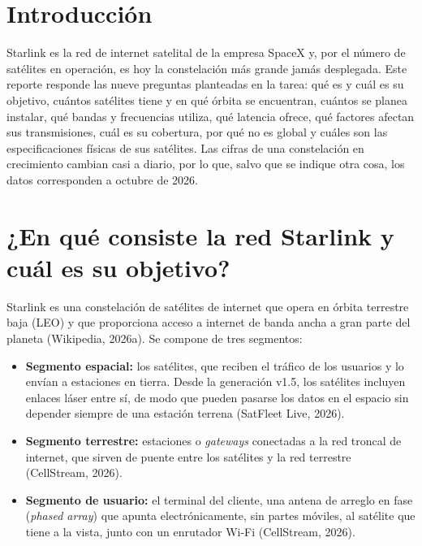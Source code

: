 \documentclass[12pt,letterpaper]{article}
\begin{document}
\tableofcontents
\newpage

\section{Introducción}

Starlink es la red de internet satelital de la empresa SpaceX y, por el número de satélites en operación, es hoy la constelación más grande jamás desplegada. Este reporte responde las nueve preguntas planteadas en la tarea: qué es y cuál es su objetivo, cuántos satélites tiene y en qué órbita se encuentran, cuántos se planea instalar, qué bandas y frecuencias utiliza, qué latencia ofrece, qué factores afectan sus transmisiones, cuál es su cobertura, por qué no es global y cuáles son las especificaciones físicas de sus satélites. Las cifras de una constelación en crecimiento cambian casi a diario, por lo que, salvo que se indique otra cosa, los datos corresponden a octubre de 2026.

\section{¿En qué consiste la red Starlink y cuál es su objetivo?}

Starlink es una constelación de satélites de internet que opera en órbita terrestre baja (LEO) y que proporciona acceso a internet de banda ancha a gran parte del planeta (Wikipedia, 2026a). Se compone de tres segmentos:

\begin{itemize}[nosep]
    \item \textbf{Segmento espacial:} los satélites, que reciben el tráfico de los usuarios y lo envían a estaciones en tierra. Desde la generación v1.5, los satélites incluyen enlaces láser entre sí, de modo que pueden pasarse los datos en el espacio sin depender siempre de una estación terrena (SatFleet Live, 2026).
    \item \textbf{Segmento terrestre:} estaciones o \textit{gateways} conectadas a la red troncal de internet, que sirven de puente entre los satélites y la red terrestre (CellStream, 2026).
    \item \textbf{Segmento de usuario:} el terminal del cliente, una antena de arreglo en fase (\textit{phased array}) que apunta electrónicamente, sin partes móviles, al satélite que tiene a la vista, junto con un enrutador Wi-Fi (CellStream, 2026).
\end{itemize}
\end{document}
